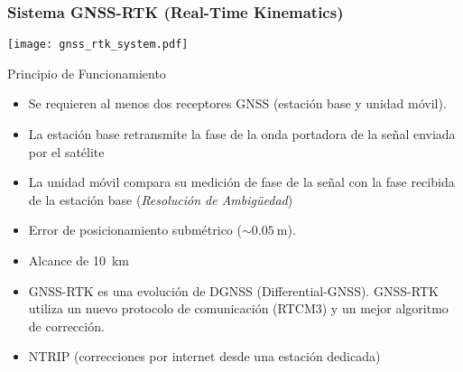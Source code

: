 \begin{frame}

\end{frame}

\begin{frame}
    \frametitle{Sistema GNSS-RTK (Real-Time Kinematics)}
    \footnotesize
    \begin{center}
        \texttt{[image: gnss\_rtk\_system.pdf]}
    \end{center}
    
    \begin{block}{Principio de Funcionamiento}
        \begin{itemize}
            \item Se requieren al menos dos receptores GNSS (estación base y unidad móvil). 
            \item La estación base retransmite la fase de la onda portadora de la señal enviada por el satélite 
            \item La unidad móvil compara su medición de fase de la señal con la fase recibida de la estación base (\emph{Resolución de Ambig{\"u}edad})
        \end{itemize}
    \end{block}
 
    \begin{itemize}
        \item Error de posicionamiento submétrico ($\sim\SI{0.05}{\meter}$).
        \item Alcance de \SI{10}{\km}
        \item GNSS-RTK es una evolución de DGNSS (Differential-GNSS). GNSS-RTK utiliza un nuevo protocolo de comunicación (RTCM3) y un mejor algoritmo de corrección.
        \item NTRIP (correcciones por internet desde una estación dedicada)
    \end{itemize}



\end{frame}
